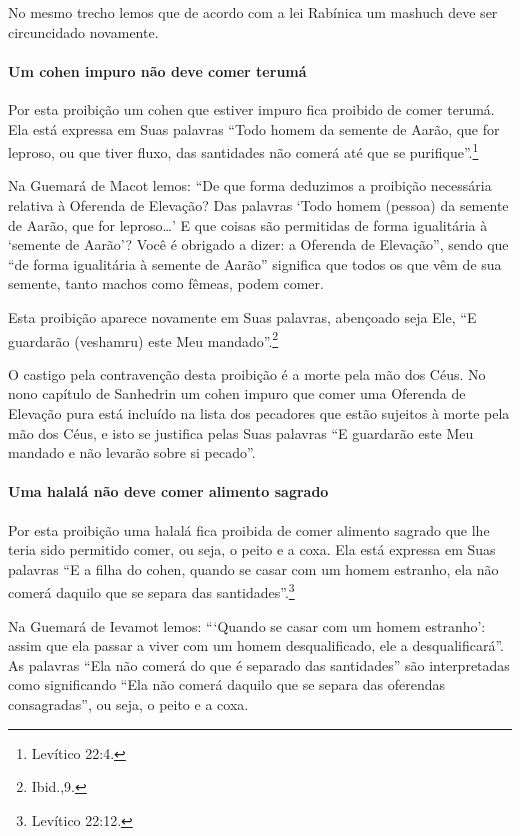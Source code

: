 \begin{multicols}{2}
No mesmo trecho lemos que de acordo com a lei Rabínica um mashuch\starr{}
deve ser circuncidado novamente.

\paragraph{Um cohen\starr{} impuro não deve comer terumá\starr}

Por esta proibição um cohen\starr{} que estiver impuro fica proibido de
comer terumá\starr. Ela está expressa em Suas palavras ``Todo homem da
semente de Aarão, que for leproso, ou que tiver fluxo, das santidades
não comerá até que se purifique''.\footnote{Levítico 22:4.}

Na Guemará\starr{} de Macot\starr{} lemos: ``De que forma deduzimos a proibição
necessária relativa à Oferenda de Elevação? Das palavras `Todo homem
(pessoa) da semente de Aarão, que for leproso\ldots{}' E que coisas são
permitidas de forma igualitária à `semente de Aarão'? Você é obrigado a
dizer: a Oferenda de Elevação'', sendo que ``de forma igualitária à
semente de Aarão'' significa que todos os que vêm de sua semente, tanto
machos como fêmeas, podem comer.

Esta proibição aparece novamente em Suas palavras, abençoado seja Ele,
``E guardarão (veshamru\starr) este Meu mandado''.\footnote{Ibid.,9.}

O castigo pela contravenção desta proibição é a morte pela mão dos Céus.
No nono capítulo de Sanhedrin\starr{} um cohen\starr{} impuro que comer uma Oferenda
de Elevação pura está incluído na lista dos pecadores que estão sujeitos
à morte pela mão dos Céus, e isto se justifica pelas Suas palavras ``E
guardarão este Meu mandado e não levarão sobre si pecado''.

\paragraph{Uma halalá\starr{} não deve comer alimento sagrado}

Por esta proibição uma halalá\starr{} fica proibida de
comer alimento sagrado que lhe teria sido permitido comer, ou seja, o
peito e a coxa. Ela está expressa em Suas palavras ``E a filha do
cohen\starr, quando se casar com um homem estranho, ela não comerá daquilo
que se separa das santidades''.\footnote{Levítico 22:12.}

Na Guemará\starr{} de Ievamot\starr{} lemos: ```Quando se casar com um homem estranho':
assim que ela passar a viver com um homem desqualificado, ele a
desqualificará''. As palavras ``Ela não comerá do que é separado das
santidades'' são interpretadas como significando ``Ela não comerá
daquilo que se separa das oferendas consagradas'', ou seja, o peito e a
coxa.


\end{multicols}
